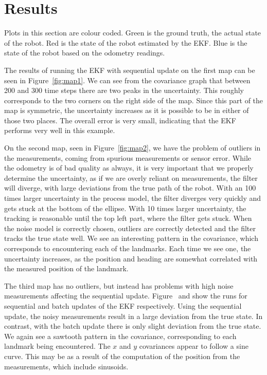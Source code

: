 \documentclass[a4paper,12pt]{article}
\begin{document}
\section{Results}
Plots in this section are colour coded. Green is the ground truth, the actual
state of the robot. Red is the state of the robot estimated by the EKF. Blue is
the state of the robot based on the odometry readings.

The results of running the EKF with sequential update on the first map can be
seen in Figure~\ref{fig:map1}. We can see from the covariance graph that between
200 and 300 time steps there are two peaks in the uncertainty. This roughly
corresponds to the two corners on the right side of the map. Since this part of
the map is symmetric, the uncertainty increases as it is possible to be in
either of those two places. The overall error is very small, indicating that the
EKF performs very well in this example.

On the second map, seen in Figure~\ref{fig:map2}, we have the problem of
outliers in the measurements, coming from spurious measurements or sensor
error. While the odometry is of bad quality as always, it is very important that
we properly determine the uncertainty, as if we are overly reliant on
measurements, the filter will diverge, with large deviations from the true path
of the robot. With an 100 times larger uncertainty in the process model, the
filter diverges very quickly and gets stuck at the bottom of the ellipse. With
10 times larger uncertainty, the tracking is reasonable until the top left part,
where the filter gets stuck. When the noise model is correctly chosen, outliers
are correctly detected and the filter tracks the true state well. We see an
interesting pattern in the covariance, which corresponds to encountering each of
the landmarks. Each time we see one, the uncertainty increases, as the position
and heading are somewhat correlated with the measured position of the landmark.

The third map has no outliers, but instead has problems with high noise
measurements affecting the sequential update. Figure~ and
 show the runs for sequential and batch updates of the EKF
respectively. Using the sequential update, the noisy measurements result in a
large deviation from the true state. In contrast, with the batch update there is
only slight deviation from the true state. We again see a sawtooth pattern in
the covariance, corresponding to each landmark being encountered. The $x$ and
$y$ covariances appear to follow a sine curve. This may be as a result of the
computation of the position from the measurements, which include sinusoids.
\end{document}
